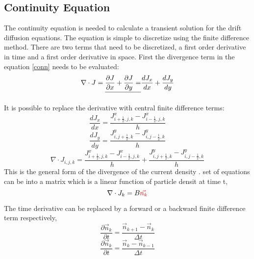 \begin{doublespace}
\clearpage
\subsection{Continuity Equation}
The continuity equation is needed to calculate a transient solution for the drift diffusion equations. The equation is simple to discretize using the finite difference method. There are two terms that need to be discretized, a first order derivative in time and a first order derivative in space. First the divergence term in the equation \eqref{conn} needs to be evaluated:
\begin{equation}
\nabla \cdot J=\tjsr{\frac{\partial J}{\partial x}+\frac{\partial J}{\partial y}=}{}\frac{d J_x}{d x}+\frac{d J_y}{d y}
\end{equation}

It is possible to replace the derivative with central finite difference terms:
\begin{equation}
\frac{d J_x}{d x}=\frac{J^x_{i+\frac{1}{2},j,k}-J^x_{i-\frac{1}{2},j,k}}{h}
\end{equation}
\begin{equation}
\frac{d J_y}{d y}=\frac{J^y_{i,j+\frac{1}{2},k}-J^y_{i,j-\frac{1}{2},k}}{h}
\end{equation}
\begin{equation}
\nabla \cdot J_{i,j,k}=\frac{J^x_{i+\frac{1}{2},j,k}-J^x_{i-\frac{1}{2},j,k}}{h}+\frac{J^y_{i,j+\frac{1}{2},k}-J^y_{i,j-\frac{1}{2},k}}{h}
\label{delJ}
\end{equation}
This is the general form of the divergence of the current density .  set of equations can be  into a matrix  which is a linear function of  particle densit at time t,
\begin{equation}
\nabla \cdot J_k = B \tjs{\vec{n_k}
}\label{fd_div}
\end{equation}

The time derivative can be replaced by a forward or a backward finite difference term respectively,
\begin{equation}
\frac{\partial  \vec{n}_k}{\partial t}=\frac{ \vec{n}_{k+1}-\vec{n}_k}{\Delta t}
\label{forwardtime}
\end{equation}
\begin{equation}
\frac{\partial \vec{n}_k}{\partial t}=\frac{ \vec{n}_k- \vec{n}_{k-1}}{\Delta t}
\label{backwardtime}
\end{equation}


\end{doublespace}
